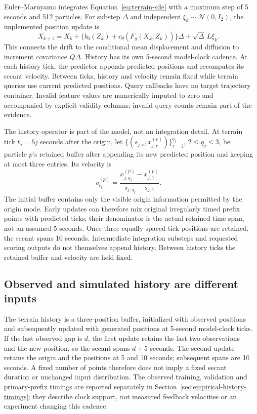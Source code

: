 \documentclass[11pt]{article}
\begin{document}
Euler--Maruyama integrates Equation~\eqref{eq:terrain-sde} with a maximum step
of 5 seconds and 512 particles. For substep \(\Delta\) and independent
\(\xi_k\sim\mathcal N(0,I_2)\), the implemented position update is
\begin{equation}
 X_{k+1}=X_k+\{b_0(Z_k)+c_\theta(F_g(X_k,Z_k))\}\Delta
             +\sqrt{\Delta}\,L\xi_k .
 \label{eq:terrain-update}
\end{equation}
This connects the drift to the conditional mean displacement and diffusion
to increment covariance \(Q\Delta\). History has its own 5-second model-clock cadence.
At each history tick, the predictor appends predicted positions and recomputes
its secant velocity. Between ticks, history and velocity remain fixed while
terrain queries use current predicted positions. Query callbacks have no
target trajectory container. Invalid feature values are numerically imputed
to zero and accompanied by explicit validity columns; invalid-query counts
remain part of the evidence.

The history operator is part of the model, not an integration detail.
At terrain tick \(t_j=5j\) seconds after the origin, let
\(\{(s_{j,r},x^{(p)}_{j,r})\}_{r=1}^{q_j}\), \(2\le q_j\le3\),
be particle \(p\)'s retained buffer after appending its new predicted position
and keeping at most three entries. Its velocity is
\begin{equation}
 v^{(p)}_{t_j}=\frac{x^{(p)}_{j,q_j}-x^{(p)}_{j,1}}
                         {s_{j,q_j}-s_{j,1}} .
 \label{eq:terrain-history}
\end{equation}
The initial buffer contains only the visible origin information permitted by
the origin mode. Early updates can therefore mix original irregularly timed
prefix points with predicted ticks; their denominator is the actual retained
time span, not an assumed 5 seconds. Once three equally spaced tick positions
are retained, the secant spans 10 seconds. Intermediate integration substeps
and requested scoring outputs do not themselves append history. Between
history ticks the retained buffer and velocity are held fixed.

\subsection{Observed and simulated history are different inputs}
\label{sec:history-feedback}
The terrain history is a three-position buffer, initialized with observed
positions and subsequently updated with generated positions at 5-second
model-clock ticks. If the last observed gap is \(d\), the first update
retains the last two observations and the new position, so the secant spans
\(d+5\) seconds. The second update retains the origin and the positions
at 5 and 10 seconds; subsequent spans are 10 seconds. A fixed number of
points therefore does not imply a fixed secant duration or unchanged
input distribution. The observed training, validation and primary-prefix
timings are reported separately in
Section~\ref{sec:empirical-history-timings}; they describe clock support,
not measured feedback velocities or an experiment changing this cadence.
\end{document}

